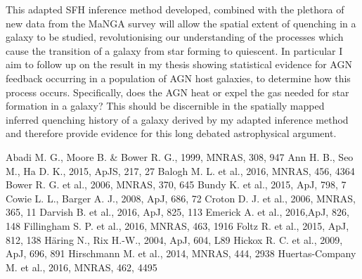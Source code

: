 \documentclass[12pt, usenatbib]{article}
\begin{document}
This adapted SFH inference method developed, combined with the plethora of new data from the MaNGA survey will allow the spatial extent of quenching in a galaxy to be studied, revolutionising our understanding of the processes which cause the transition of a galaxy from star forming to quiescent. In particular I aim to follow up on the result in my thesis showing statistical evidence for AGN feedback occurring in a population of AGN host galaxies, to determine how this process occurs. Specifically, does the AGN heat or expel the gas needed for star formation in a galaxy? This should be discernible in the spatially mapped inferred quenching history of a galaxy derived by my adapted inference method and therefore provide evidence for this long debated astrophysical argument.  

\begin{thebibliography}{}
\tiny
\setlength{\parskip}{0.01ex}
 \linespread{0.1}
\begin{multicols}{2}
 Abadi M. G., Moore B. \& Bower R. G., 1999, MNRAS, 308, 947
 Ann H. B., Seo M., Ha D. K., 2015, ApJS, 217, 27
 Balogh M. L. et al., 2016, MNRAS, 456, 4364
 Bower R. G. et al., 2006, MNRAS, 370, 645
 Bundy K. et al., 2015, ApJ, 798, 7   
 Cowie L. L., Barger A. J., 2008, ApJ, 686, 72
 Croton D. J. et al., 2006, MNRAS, 365, 11
 Darvish B. et al., 2016, ApJ, 825, 113
 Emerick A. et al., 2016,ApJ, 826, 148
 Fillingham S. P. et al., 2016, MNRAS, 463, 1916
 Foltz R. et al., 2015, ApJ, 812, 138
 H\"aring N., Rix H.-W., 2004, ApJ, 604, L89
 Hickox R. C. et al., 2009, ApJ, 696, 891
 Hirschmann M. et al., 2014, MNRAS, 444, 2938
 Huertas-Company M. et al., 2016, MNRAS, 462, 4495

\end{multicols}
\end{thebibliography}
\end{document}
